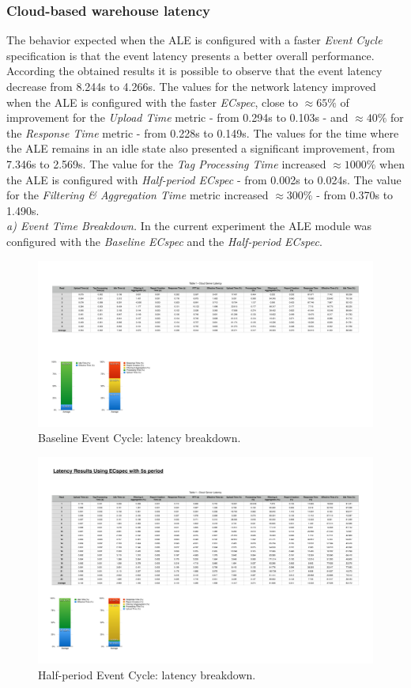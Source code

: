 \subsubsection{Cloud-based warehouse latency}
\label{subs:eval_exp_latency_ecspec_fast}
The behavior expected when the \gls{ALE} is configured with a faster \textit{Event Cycle} specification
is that the event latency presents a better overall performance. According the obtained results it is possible
to observe that the event latency decrease from 8.244s to 4.266s. The values for the network latency
improved when the \gls{ALE} is configured with the faster \textit{ECspec}, close to $\approx65\%$ of
improvement for the \textit{Upload Time} metric - from 0.294s to 0.103s - and $\approx40\%$ for the
\textit{Response Time} metric - from 0.228s to 0.149s. The values for the time where the \gls{ALE}
remains in an idle state also presented a significant improvement, from 7.346s to 2.569s. The value
for the \textit{Tag Processing Time} increased $\approx1000\%$ when the \gls{ALE} is configured with
\textit{Half-period ECspec} - from 0.002s to 0.024s. The value for the \textit{Filtering \& Aggregation Time}
metric increased $\approx300\%$ - from 0.370s to 1.490s.\\

\textit{a) Event Time Breakdown.}
In the current experiment the \gls{ALE} module was configured with the \textit{Baseline ECspec} and
the \textit{Half-period ECspec}.\\

\begin{figure}[ht!]
  \centering
  \includegraphics[width=.6\linewidth]{./figures/cloud_ecspec_breakdown}
  \caption{Baseline Event Cycle: latency breakdown.}
  \label{fig:ecspecf_base}
\end{figure}

\begin{figure}[ht!]
  \centering
  \includegraphics[width=.6\linewidth]{./figures/cloud_ecspecf_breakdown}
  \caption{Half-period Event Cycle: latency breakdown.}
  \label{fig:ecspecf_half}
\end{figure}


